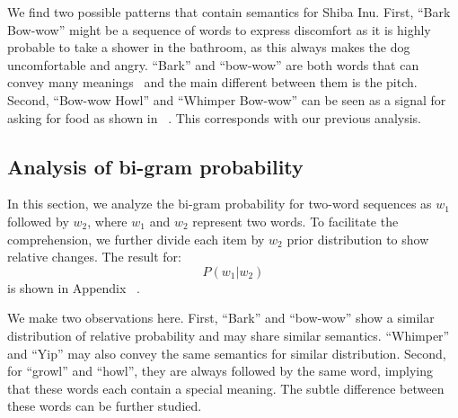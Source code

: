 We find two possible patterns that contain semantics for Shiba Inu. 
First, ``Bark Bow-wow'' might be a sequence of words to express discomfort as it is highly probable to take a shower in the bathroom, as this always makes the dog uncomfortable and angry. ``Bark'' and ``bow-wow'' are both words that can convey many meanings~\cite{yeon2007vocal} and the main different between them is the pitch.
Second, ``Bow-wow Howl'' and ``Whimper Bow-wow'' can be seen as a signal for asking for food as shown in ~. This corresponds with our previous analysis. 





\subsection{Analysis of bi-gram probability}
In this section, we analyze the bi-gram probability for two-word sequences 
as $w_1$ followed by $w_2$, where $w_1$ and $w_2$ represent two words. 
To facilitate the comprehension, we further divide each item by $w_2$ 
prior distribution to show relative changes. The result for: 
\begin{equation}
{P (w_1|w_2)}
\end{equation}
is shown in Appendix ~. 

We make two observations here. First, ``Bark'' and ``bow-wow'' show a 
similar distribution of relative probability and may share similar semantics. 
``Whimper'' and ``Yip'' may also 
convey the same semantics for similar distribution. Second, for ``growl'' 
and ``howl'', they are always followed by the same word, 
implying that these words each contain a special meaning. The subtle difference between these words can be further studied. 



